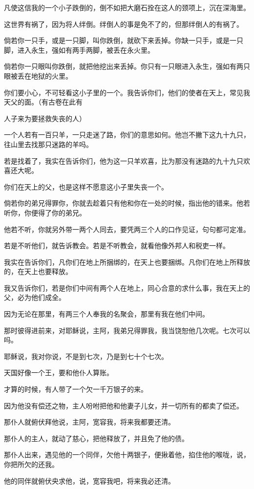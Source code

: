 \documentclass[12pt,oneside]{book}
\begin{document}
凡使这信我的一个小子跌倒的，倒不如把大磨石拴在这人的颈项上，沉在深海里。

这世界有祸了，因为将人绊倒。绊倒人的事是免不了的，但那绊倒人的有祸了。

倘若你一只手，或是一只脚，叫你跌倒，就砍下来丢掉。你缺一只手，或是一只脚，进入永生，强如有两手两脚，被丢在永火里。

倘若你一只眼叫你跌倒，就把他挖出来丢掉。你只有一只眼进入永生，强如有两只眼被丢在地狱的火里。

你们要小心，不可轻看这小子里的一个。我告诉你们，他们的使者在天上，常见我天父的面。（有古卷在此有

人子来为要拯救失丧的人）

一个人若有一百只羊，一只走迷了路，你们的意思如何。他岂不撇下这九十九只，往山里去找那只迷路的羊吗。

若是找着了，我实在告诉你们，他为这一只羊欢喜，比为那没有迷路的九十九只欢喜还大呢。

你们在天上的父，也是这样不愿意这小子里失丧一个。

倘若你的弟兄得罪你，你就去趁着只有他和你在一处的时候，指出他的错来。他若听你，你便得了你的弟兄。

他若不听，你就另外带一两个人同去，要凭两三个人的口作见证，句句都可定准。

若是不听他们，就告诉教会。若是不听教会，就看他像外邦人和税吏一样。

我实在告诉你们，凡你们在地上所捆绑的，在天上也要捆绑。凡你们在地上所释放的，在天上也要释放。

我又告诉你们，若是你们中间有两个人在地上，同心合意的求什么事，我在天上的父，必为他们成全。

因为无论在那里，有两三个人奉我的名聚会，那里有我在他们中间。

那时彼得进前来，对耶稣说，主阿，我弟兄得罪我，我当饶恕他几次呢。七次可以吗。

耶稣说，我对你说，不是到七次，乃是到七十个七次。

天国好像一个王，要和他仆人算账。

才算的时候，有人带了一个欠一千万银子的来。

因为他没有偿还之物，主人吩咐把他和他妻子儿女，并一切所有的都卖了偿还。

那仆人就俯伏拜他说，主阿，宽容我，将来我都要还清。

那仆人的主人，就动了慈心，把他释放了，并且免了他的债。

那仆人出来，遇见他的一个同伴，欠他十两银子，便揪着他，掐住他的喉咙，说，你把所欠的还我。

他的同伴就俯伏央求他，说，宽容我吧，将来我必还清。
\end{document}
